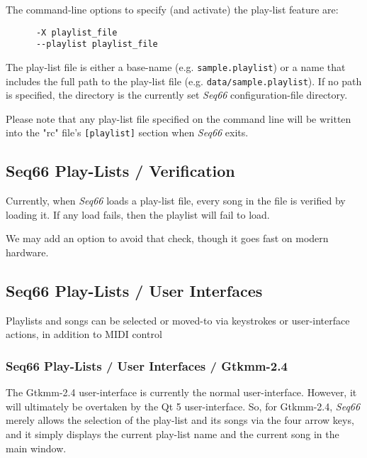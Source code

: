    The command-line options to specify (and activate) the play-list feature
   are:

   \begin{verbatim}
      -X playlist_file
      --playlist playlist_file
   \end{verbatim}

   The play-list file is either a base-name (e.g. \texttt{sample.playlist})
   or a name that includes the full path to the play-list file
   (e.g. \texttt{data/sample.playlist}).
   If no path is specified, the directory is the currently set
   \textsl{Seq66} configuration-file directory.

   Please note that any play-list file specified on the command line
   will be written into the "rc" file's \texttt{[playlist]} section when
   \textsl{Seq66} exits.

\subsection{Seq66 Play-Lists / Verification}
\label{subsec:playlist_verify}

   Currently, when \textsl{Seq66} loads a play-list file, every
   song in the file is verified by loading it.  If any load fails, then
   the playlist will fail to load.

   We may add an option to avoid that check, though it goes fast on
   modern hardware.

\subsection{Seq66 Play-Lists / User Interfaces}
\label{subsec:playlist_uis}

   Playlists and songs can be selected or moved-to via keystrokes or
   user-interface actions, in addition to MIDI control

\subsubsection{Seq66 Play-Lists / User Interfaces / Gtkmm-2.4}
\label{subsubsec:playlist_ui_gtk}

   The Gtkmm-2.4 user-interface is currently the normal user-interface.
   However, it will ultimately be overtaken by the Qt 5 user-interface.
   So, for Gtkmm-2.4, \textsl{Seq66} merely allows the selection of the
   play-list and its songs via the four arrow keys, and it simply displays the
   current play-list name and the current song in the main window.

